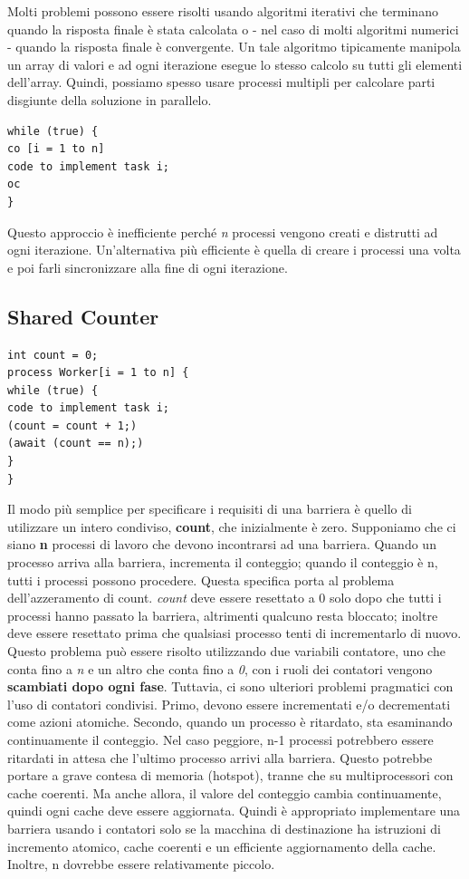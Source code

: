 \documentclass[10pt,a4paper]{article}
\begin{document}
Molti problemi possono essere risolti usando algoritmi iterativi che terminano quando la risposta finale è stata calcolata o - nel caso di molti algoritmi numerici - quando la risposta finale è convergente. Un tale algoritmo tipicamente manipola un array di valori e ad ogni iterazione esegue lo stesso calcolo su tutti gli elementi dell'array.
Quindi, possiamo spesso usare processi multipli per calcolare parti disgiunte della soluzione in parallelo. 
\begin{verbatim}
while (true) {
co [i = 1 to n]
code to implement task i;
oc
}
\end{verbatim} 
Questo approccio è inefficiente perché \textit{n} processi vengono creati e distrutti ad ogni iterazione.
Un'alternativa più efficiente è quella di creare i processi una volta e poi farli sincronizzare alla fine di ogni iterazione.

\subsection{Shared Counter}
\begin{verbatim}
int count = 0;
process Worker[i = 1 to n] {
while (true) {
code to implement task i;
(count = count + 1;)
(await (count == n);)
}
}
\end{verbatim}
Il modo più semplice per specificare i requisiti di una barriera è quello di utilizzare un intero condiviso, \textbf{count}, che inizialmente è zero. Supponiamo che ci siano \textbf{n} processi di lavoro che devono incontrarsi ad una barriera. Quando un processo arriva alla barriera, incrementa il conteggio; quando il conteggio è n, tutti i processi possono procedere. Questa specifica porta al problema dell'azzeramento di count. \textit{count} deve essere resettato a 0 solo dopo che tutti i processi hanno passato la barriera, altrimenti qualcuno resta bloccato; inoltre deve essere resettato prima che qualsiasi processo tenti di incrementarlo di nuovo.
Questo problema può essere risolto utilizzando due variabili contatore, uno
che conta fino a \textit{n} e un altro che conta fino a \textit{0}, con i ruoli dei contatori vengono \textbf{scambiati dopo ogni fase}. Tuttavia, ci sono ulteriori problemi pragmatici con l'uso di contatori condivisi. Primo, devono essere incrementati e/o decrementati come azioni atomiche. Secondo, quando un processo è ritardato, sta esaminando continuamente il conteggio. Nel caso peggiore, n-1 processi potrebbero essere ritardati in attesa che l'ultimo processo arrivi alla barriera. Questo potrebbe portare a grave contesa di memoria (hotspot), tranne che su multiprocessori con cache coerenti. Ma anche allora, il valore del conteggio cambia continuamente, quindi ogni cache deve essere aggiornata. Quindi è appropriato implementare una barriera usando i contatori solo se la macchina di destinazione ha istruzioni di incremento atomico, cache coerenti e un efficiente aggiornamento della cache. Inoltre, n dovrebbe essere relativamente piccolo.
\end{document}
